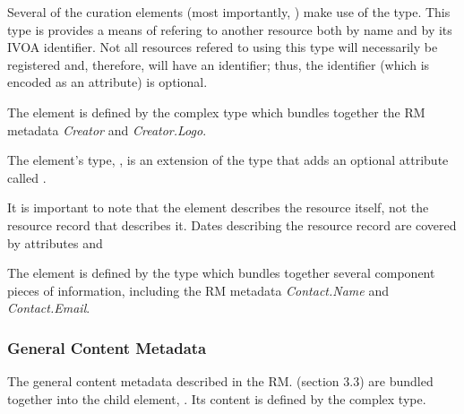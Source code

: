 \documentclass[11pt,a4paper]{ivoa}
\begin{document}

Several of the curation elements (most importantly,
) make use of the
 type.  This type is provides a means of
refering to another resource both by name and by its IVOA
identifier.  Not all resources refered to using this type will
necessarily be registered and, therefore, will have an identifier;
thus, the identifier (which is encoded as an attribute) is optional. 




The  element is defined by the  complex
type which bundles together the RM metadata \emph{Creator} and
\emph{Creator.Logo}.





The  element's type, , is an extension of the
 type that adds an
optional attribute called .  




It is important to note that the  element describes the
resource itself, not the resource record that describes it.  Dates
describing the resource record are covered by 
attributes  and 



The  element is defined by the
 type which bundles together several component
pieces of information, including the RM metadata \emph{Contact.Name}
and \emph{Contact.Email}.  






\subsubsection{General Content Metadata}


The general content metadata described in the RM.
(section 3.3) are bundled together into the 
child element, .  Its content is
defined by the  complex type.


\end{document}
